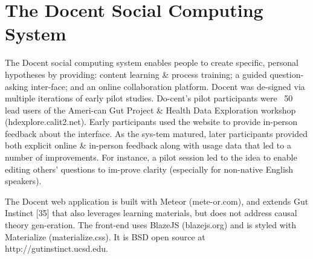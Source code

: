 \section{The Docent Social Computing System}
The Docent social computing system enables people to create specific, personal hypotheses by providing: content learning \& process training; a guided question-asking inter-face; and an online collaboration platform. Docent was de-signed via multiple iterations of early pilot studies. Do-cent’s pilot participants were ~50 lead users of the Ameri-can Gut Project \& Health Data Exploration workshop (hdexplore.calit2.net). Early participants used the website to provide in-person feedback about the interface. As the sys-tem matured, later participants provided both explicit online \& in-person feedback along with usage data that led to a number of improvements. For instance, a pilot session led to the idea to enable editing others’ questions to im-prove clarity (especially for non-native English speakers).

The Docent web application is built with Meteor (mete-or.com), and extends Gut Instinct [35] that also leverages learning materials, but does not address causal theory gen-eration. The front-end uses BlazeJS (blazejs.org) and is styled with Materialize (materialize.css). It is BSD open source at http://gutinstinct.ucsd.edu.

